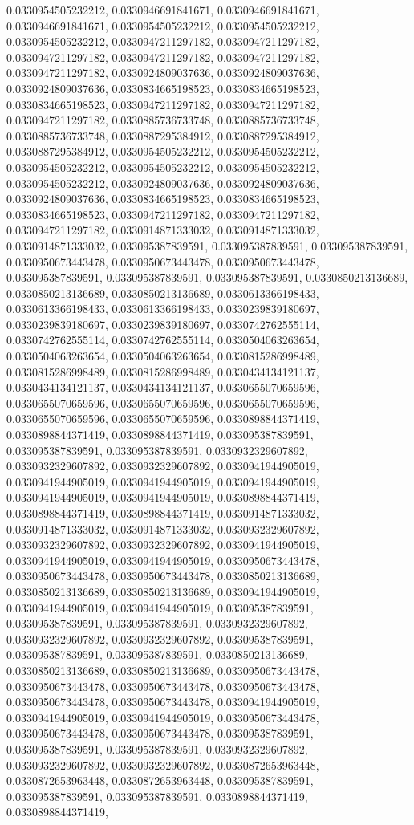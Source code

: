 \documentclass[
  ,man]{apa6}
\begin{document}
0.0330954505232212, 0.0330946691841671, 0.0330946691841671, 0.0330946691841671, 0.0330954505232212, 0.0330954505232212, 0.0330954505232212, 0.0330947211297182, 0.0330947211297182, 0.0330947211297182, 0.0330947211297182, 0.0330947211297182, 0.0330947211297182, 0.0330924809037636, 0.0330924809037636, 0.0330924809037636, 0.0330834665198523, 0.0330834665198523, 0.0330834665198523, 0.0330947211297182, 0.0330947211297182, 0.0330947211297182, 0.0330885736733748, 0.0330885736733748, 0.0330885736733748, 0.0330887295384912,
0.0330887295384912, 0.0330887295384912, 0.0330954505232212, 0.0330954505232212, 0.0330954505232212, 0.0330954505232212, 0.0330954505232212, 0.0330954505232212, 0.0330924809037636, 0.0330924809037636, 0.0330924809037636, 0.0330834665198523, 0.0330834665198523, 0.0330834665198523, 0.0330947211297182, 0.0330947211297182, 0.0330947211297182, 0.0330914871333032, 0.0330914871333032, 0.0330914871333032, 0.033095387839591, 0.033095387839591, 0.033095387839591, 0.0330950673443478, 0.0330950673443478, 0.0330950673443478,
0.033095387839591, 0.033095387839591, 0.033095387839591, 0.0330850213136689, 0.0330850213136689, 0.0330850213136689, 0.0330613366198433, 0.0330613366198433, 0.0330613366198433, 0.0330239839180697, 0.0330239839180697, 0.0330239839180697, 0.0330742762555114, 0.0330742762555114, 0.0330742762555114, 0.0330504063263654, 0.0330504063263654, 0.0330504063263654, 0.0330815286998489, 0.0330815286998489, 0.0330815286998489, 0.0330434134121137, 0.0330434134121137, 0.0330434134121137, 0.0330655070659596, 0.0330655070659596,
0.0330655070659596, 0.0330655070659596, 0.0330655070659596, 0.0330655070659596, 0.0330898844371419, 0.0330898844371419, 0.0330898844371419, 0.033095387839591, 0.033095387839591, 0.033095387839591, 0.0330932329607892, 0.0330932329607892, 0.0330932329607892, 0.0330941944905019, 0.0330941944905019, 0.0330941944905019, 0.0330941944905019, 0.0330941944905019, 0.0330941944905019, 0.0330898844371419, 0.0330898844371419, 0.0330898844371419, 0.0330914871333032, 0.0330914871333032, 0.0330914871333032, 0.0330932329607892,
0.0330932329607892, 0.0330932329607892, 0.0330941944905019, 0.0330941944905019, 0.0330941944905019, 0.0330950673443478, 0.0330950673443478, 0.0330950673443478, 0.0330850213136689, 0.0330850213136689, 0.0330850213136689, 0.0330941944905019, 0.0330941944905019, 0.0330941944905019, 0.033095387839591, 0.033095387839591, 0.033095387839591, 0.0330932329607892, 0.0330932329607892, 0.0330932329607892, 0.033095387839591, 0.033095387839591, 0.033095387839591, 0.0330850213136689, 0.0330850213136689, 0.0330850213136689,
0.0330950673443478, 0.0330950673443478, 0.0330950673443478, 0.0330950673443478, 0.0330950673443478, 0.0330950673443478, 0.0330941944905019, 0.0330941944905019, 0.0330941944905019, 0.0330950673443478, 0.0330950673443478, 0.0330950673443478, 0.033095387839591, 0.033095387839591, 0.033095387839591, 0.0330932329607892, 0.0330932329607892, 0.0330932329607892, 0.0330872653963448, 0.0330872653963448, 0.0330872653963448, 0.033095387839591, 0.033095387839591, 0.033095387839591, 0.0330898844371419, 0.0330898844371419,
\end{document}
